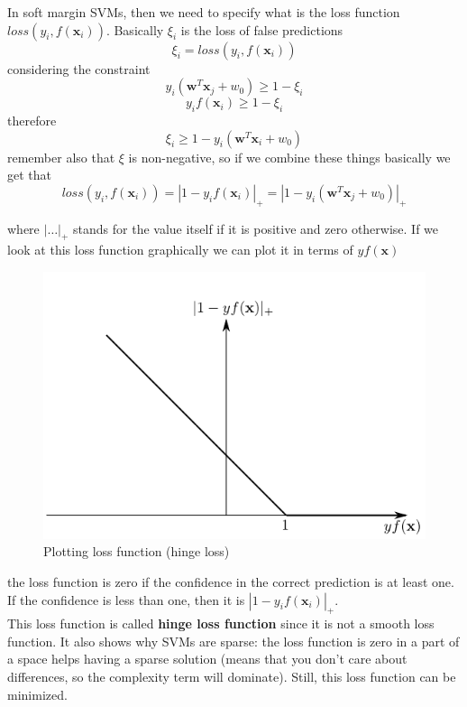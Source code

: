 In soft margin SVMs, then we need to specify what is the loss function
$loss(y_{i}, f(\pmb{x}_{i}))$. Basically $\xi_{i}$ is the loss of false predictions
\[
	\xi_{i}= loss(y_{i}, f(\pmb{x}_{i}))
\]
considering the constraint
\[
	y_{i}(\pmb{w}^{T}\pmb{x}_{j}+ w_{0}) \geq 1 - \xi_{i}
\]
\[
	y_{i}f(\pmb{x}_{i}) \geq 1 - \xi_{i}
\]
therefore
\[
	\xi_{i}\geq 1 - y_{i}(\pmb{w}^{T}\pmb{x}_{i}+ w_{0})
\]
remember also that $\xi$ is non-negative, so if we combine these things
basically we get that
\begin{equation}
	loss(y_{i}, f(\pmb{x}_{i})) = |1 - y_{i}f(\pmb{x}_{i})|_{+}= |1 - y_{i}(\pmb{w}
	^{T}\pmb{x}_{j}+ w_{0})|_{+}
\end{equation}

where $|\dots|_{+}$ stands for the value itself if it is positive and zero otherwise.
If we look at this loss function graphically we can plot it in terms of
$y f(\pmb{x})$
\begin{figure}[H]
	\centering
	\includegraphics[scale=0.5]{
        images/13_SupportVectorMachines_hingeLoss.png
    }
	\caption{Plotting loss function (hinge loss)}
	\label{fig:plot_loss_fun}
\end{figure}
the loss function is zero if the confidence in the correct prediction is at
least one. If the confidence is less than one, then it is
$|1 - y_{i}f(\pmb{x}_{i})|_{+}$.\\ This loss function is called \textbf{hinge
loss function} since it is not a smooth loss function. It also shows why SVMs
are sparse: the loss function is zero in a part of a space helps having a sparse
solution (means that you don't care about differences, so the complexity term will
dominate). Still, this loss function can be minimized.

